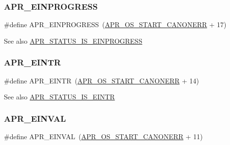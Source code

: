 \subsubsection{\texorpdfstring{A\+P\+R\+\_\+\+E\+I\+N\+P\+R\+O\+G\+R\+E\+SS}{APR\_EINPROGRESS}}
{\footnotesize\ttfamily \#define A\+P\+R\+\_\+\+E\+I\+N\+P\+R\+O\+G\+R\+E\+SS~(\mbox{\hyperlink{group__apr__errno_ga7bca957c11b80b31cb54b0d2cbe9e025}{A\+P\+R\+\_\+\+O\+S\+\_\+\+S\+T\+A\+R\+T\+\_\+\+C\+A\+N\+O\+N\+E\+RR}} + 17)}

\begin{DoxySeeAlso}{See also}
\mbox{\hyperlink{group___a_p_r___s_t_a_t_u_s___i_s_ga777e9ba36fe05ac8002113a9597073ea}{A\+P\+R\+\_\+\+S\+T\+A\+T\+U\+S\+\_\+\+I\+S\+\_\+\+E\+I\+N\+P\+R\+O\+G\+R\+E\+SS}} 
\end{DoxySeeAlso}
\mbox{\label{group___a_p_r___error_gaee1ce306c0ebf1701b34172310aa1bd5}} 
\subsubsection{\texorpdfstring{A\+P\+R\+\_\+\+E\+I\+N\+TR}{APR\_EINTR}}
{\footnotesize\ttfamily \#define A\+P\+R\+\_\+\+E\+I\+N\+TR~(\mbox{\hyperlink{group__apr__errno_ga7bca957c11b80b31cb54b0d2cbe9e025}{A\+P\+R\+\_\+\+O\+S\+\_\+\+S\+T\+A\+R\+T\+\_\+\+C\+A\+N\+O\+N\+E\+RR}} + 14)}

\begin{DoxySeeAlso}{See also}
\mbox{\hyperlink{group___a_p_r___s_t_a_t_u_s___i_s_ga30615baf6479221e44870c620e372b5b}{A\+P\+R\+\_\+\+S\+T\+A\+T\+U\+S\+\_\+\+I\+S\+\_\+\+E\+I\+N\+TR}} 
\end{DoxySeeAlso}
\mbox{\label{group___a_p_r___error_gae3ffc41994444e71ce522c036ca1d9a4}} 
\subsubsection{\texorpdfstring{A\+P\+R\+\_\+\+E\+I\+N\+V\+AL}{APR\_EINVAL}}
{\footnotesize\ttfamily \#define A\+P\+R\+\_\+\+E\+I\+N\+V\+AL~(\mbox{\hyperlink{group__apr__errno_ga7bca957c11b80b31cb54b0d2cbe9e025}{A\+P\+R\+\_\+\+O\+S\+\_\+\+S\+T\+A\+R\+T\+\_\+\+C\+A\+N\+O\+N\+E\+RR}} + 11)}

